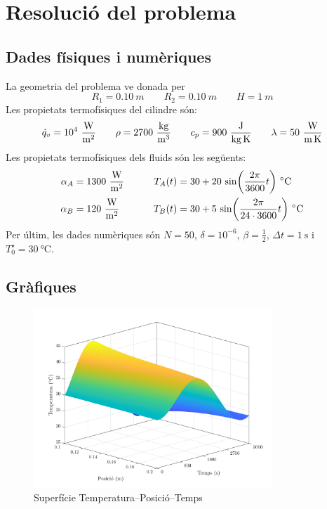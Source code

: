 \clearpage

\section{Resolució del problema}

\subsection{Dades físiques i numèriques}

La geometria del problema ve donada per
\[
	R_1 = 0.10 \ \si{m} \qquad
	R_2 = 0.10 \ \si{m} \qquad
	H = 1 \ \si{m}
\]
Les propietats termofísiques del cilindre són:
\[
	\dot{q}_v = 10^{4} \ \si{\frac{\watt}{\meter^2}} \qquad
	\rho = 2700 \ \si{\frac{\kilo\gram}{\meter^3}} \qquad
	c_{p} = 900 \ \si{\frac{\joule}{\kilo\gram \, \kelvin}} \qquad
	\lambda = 50 \ \si{\frac{\watt}{\meter \,\kelvin}}	
\]
Les propietats termofísiques dels fluids són les següents:
\[
	\begin{aligned}
		\alpha_A &= 1300 \ \si{\frac{\watt}{\meter^2}} & \qquad
		T_A(t) &= 30 + 20 \, \sin(\frac{2 \pi}{3600} t) \ \si{\celsius} \\
		\alpha_B &= 120 \ \si{\frac{\watt}{\meter^2}} & \qquad
		T_B(t) &= 30 + 5 \, \sin(\frac{2 \pi}{24 \cdot 3600} t) \ \si{\celsius}
	\end{aligned}
\]
Per últim, les dades numèriques són $N = 50$, $\delta = 10^{-6}$, $\beta = \frac{1}{2}$, $\Delta t = 1 \ \si{\second}$ i $T_0^\star = 30 \ \si{\celsius}$.

\subsection{Gràfiques}

\begin{figure}[h]
	\centering
	\includegraphics[width=0.8\textwidth]{imagenes/03_resolucio/plot_3d.png}
	\caption{Superfície Temperatura--Posició--Temps}
	\label{fig:plot_3d}
\end{figure}

